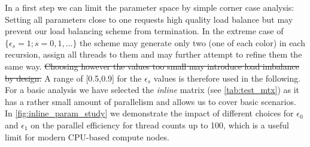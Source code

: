 In a first step we can limit the parameter space by simple corner case analysis: 
Setting all parameters close to one requests high quality load balance but may prevent our load balancing scheme from termination. In the extreme case of $\{\epsilon_s=1; s=0,1,\ldots\}$ the scheme may generate only two \levelGroups (one of each color) in each recursion, assign all threads to them and may further attempt to refine them the same way. \sout{Choosing however the values too small may introduce load imbalance by design.}  A range of  [0.5,0.9] for the $\epsilon_s$ values is therefore used in the following. For a basic analysis we have selected the \emph{inline} matrix (see \cref{tab:test_mtx}) as it has a rather small amount of parallelism and allows us to cover basic scenarios. In \cref{fig:inline_param_study}  we demonstrate the impact of different choices for $\epsilon_0$ and $\epsilon_1$ on the parallel efficiency for thread counts up to 100, which is a useful limit for modern CPU-based compute nodes. 
%
